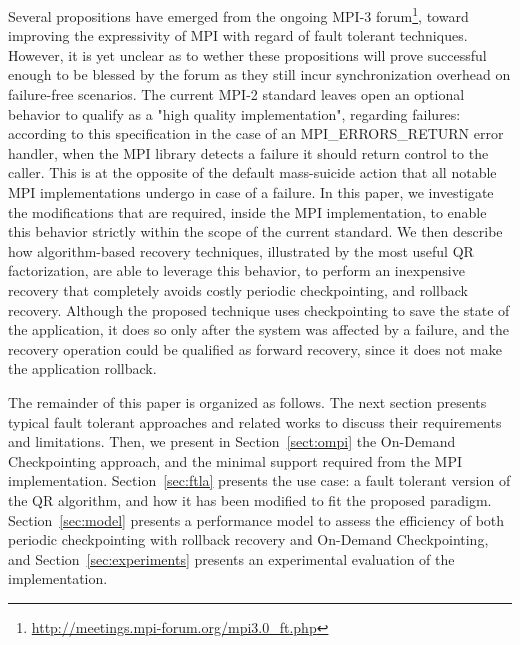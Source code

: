 Several propositions have emerged from the ongoing MPI-3
forum\footnote{\url{http://meetings.mpi-forum.org/mpi3.0\_ft.php}},
toward improving the expressivity of MPI with regard of fault tolerant
techniques. However, it is yet unclear as to wether these propositions
will prove successful enough to be blessed by the forum as they still
incur synchronization overhead on failure-free scenarios. The current
MPI-2 standard leaves open an optional behavior to qualify as a "high
quality implementation", regarding failures: according to this
specification in the case of an MPI\_ERRORS\_RETURN error handler,
when the MPI library detects a failure it should return control to the
caller. This is at the opposite of the default mass-suicide action
that all notable MPI implementations undergo in case of a failure. In
this paper, we investigate the modifications that are required, inside
the MPI implementation, to enable this behavior strictly within the
scope of the current standard. We then describe how algorithm-based
recovery techniques, illustrated by the most useful QR factorization,
are able to leverage this behavior, to perform an inexpensive recovery
that completely avoids costly periodic checkpointing, and rollback
recovery. Although the proposed technique uses checkpointing to save
the state of the application, it does so only after the system was
affected by a failure, and the recovery operation could be qualified as forward
recovery, since it does not make the application rollback.

The remainder of this paper is organized as follows. The next section
presents typical fault tolerant approaches and related works to discuss
their requirements and limitations. Then, we present in
Section~\ref{sect:ompi} the On-Demand Checkpointing approach, and the
minimal support required from the MPI implementation. 
Section~\ref{sec:ftla} presents the use case: a fault tolerant
version of the QR algorithm, and how it has been modified to fit the
proposed paradigm. Section~\ref{sec:model} presents a performance model to
assess the efficiency of both periodic checkpointing with rollback
recovery and On-Demand Checkpointing, and
Section~\ref{sec:experiments} presents an experimental evaluation of
the implementation.


